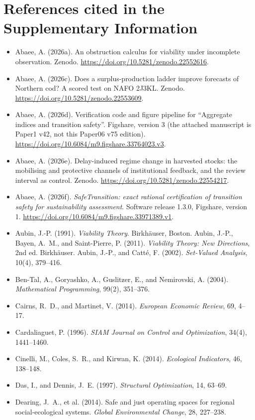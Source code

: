 \section*{References cited in the Supplementary Information}
\begin{itemize}[leftmargin=1.5em,itemsep=1pt]
\item Abaee, A. (2026a). An obstruction calculus for viability under incomplete observation. Zenodo. \url{https://doi.org/10.5281/zenodo.22552616}.
\item Abaee, A. (2026c). Does a surplus-production ladder improve forecasts of Northern cod? A scored test on NAFO 2J3KL. Zenodo. \url{https://doi.org/10.5281/zenodo.22553609}.
\item Abaee, A. (2026d). Verification code and figure pipeline for ``Aggregate indices and transition safety''. Figshare, version 3 (the attached manuscript is Paper1 v42, not this Paper06 v75 edition). \url{https://doi.org/10.6084/m9.figshare.33764023.v3}.
\item Abaee, A. (2026e). Delay-induced regime change in harvested stocks: the mobilising and protective channels of institutional feedback, and the review interval as control. Zenodo. \url{https://doi.org/10.5281/zenodo.22554217}.
\item Abaee, A. (2026f). \emph{SafeTransition: exact rational certification of transition safety for sustainability assessment}. Software release 1.3.0, Figshare, version 1. \url{https://doi.org/10.6084/m9.figshare.33971389.v1}.
\item Aubin, J.-P. (1991). \emph{Viability Theory}. Birkh\"auser, Boston. Aubin, J.-P., Bayen, A.~M., and Saint-Pierre, P. (2011). \emph{Viability Theory: New Directions}, 2nd ed. Birkh\"auser. Aubin, J.-P., and Catt\'e, F. (2002). \emph{Set-Valued Analysis}, 10(4), 379--416.
\item Ben-Tal, A., Goryashko, A., Guslitzer, E., and Nemirovski, A. (2004). \emph{Mathematical Programming}, 99(2), 351--376.
\item Cairns, R.~D., and Martinet, V. (2014). \emph{European Economic Review}, 69, 4--17.
\item Cardaliaguet, P. (1996). \emph{SIAM Journal on Control and Optimization}, 34(4), 1441--1460.
\item Cinelli, M., Coles, S.~R., and Kirwan, K. (2014). \emph{Ecological Indicators}, 46, 138--148.
\item Das, I., and Dennis, J.~E. (1997). \emph{Structural Optimization}, 14, 63--69.
\item Dearing, J.~A., et al. (2014). Safe and just operating spaces for regional social-ecological systems. \emph{Global Environmental Change}, 28, 227--238.

\end{itemize}
